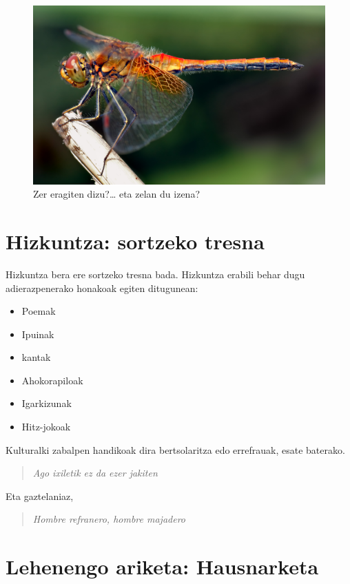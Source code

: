 \documentclass[
]{book}
\providecommand{\tightlist}{%
  \setlength{\itemsep}{0pt}\setlength{\parskip}{0pt}}
\begin{document}
\begin{figure}
\centering
\includegraphics{assets/img/Sympetrum_flaveolum_-_side_(aka).jpg}
\caption{Zer eragiten dizu?\ldots{} eta zelan du izena?}
\end{figure}

\hypertarget{hizkuntza-sortzeko-tresna}{%
\section{Hizkuntza: sortzeko tresna}\label{hizkuntza-sortzeko-tresna}}

Hizkuntza bera ere sortzeko tresna bada. Hizkuntza erabili behar dugu adierazpenerako honakoak egiten ditugunean:

\begin{itemize}
\tightlist
\item
  Poemak
\item
  Ipuinak
\item
  kantak
\item
  Ahokorapiloak
\item
  Igarkizunak
\item
  Hitz-jokoak
\end{itemize}

Kulturalki zabalpen handikoak dira bertsolaritza edo errefrauak, esate baterako.

\begin{quote}
\emph{Ago ixiletik ez da ezer jakiten}
\end{quote}

Eta gaztelaniaz,

\begin{quote}
\emph{Hombre refranero, hombre majadero}
\end{quote}

\hypertarget{T1A1}{%
\section*{Lehenengo ariketa: Hausnarketa}\label{T1A1}}
\end{document}
